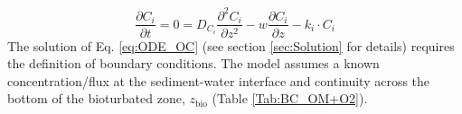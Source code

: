 \documentclass[gmd, manuscript]{copernicus}
\begin{document}
\begin{equation}
 \frac{\partial C_i}{\partial t} = 0= D_{C_i} \frac{\partial^2C_i }{\partial z^2} - w\frac{\partial C_i }{\partial z} - k_i\cdot C_{i} \label{eq:ODE_OC}
\end{equation}
The solution of Eq. \ref{eq:ODE_OC} (see section \ref{sec:Solution} for details) requires the definition of boundary conditions. The model assumes a known concentration/flux at the sediment-water interface and continuity 
across the bottom of the bioturbated zone, $z_{\mathrm{bio}}$ (Table \ref{Tab:BC_OM+O2}).
\end{document}
